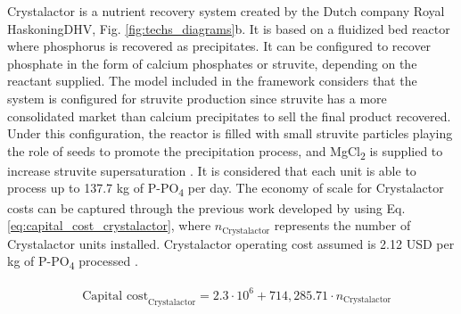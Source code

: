 \documentclass[10pt,a4paper]{article}
\begin{document}
Crystalactor is a nutrient recovery system created by the Dutch company Royal HaskoningDHV, Fig. \ref{fig:techs_diagrams}b. It is based on a fluidized bed reactor where phosphorus is recovered as precipitates. It can be configured to recover phosphate in the form of calcium phosphates or struvite, depending on the reactant supplied. The model included in the framework considers that the system is configured for struvite production since struvite has a more consolidated market than calcium precipitates to sell the final product recovered. Under this configuration, the reactor is filled with small struvite particles playing the role of seeds to promote the precipitation process, and MgCl\textsubscript{2} is supplied to increase struvite supersaturation .
It is considered that each unit is able to process up to 137.7 kg of P-PO\textsubscript{4} per day. The economy of scale for Crystalactor costs can be captured through the previous work developed by  using Eq. \ref{eq:capital_cost_crystalactor}, where $n_{\text{Crystalactor}}$ represents the number of Crystalactor units installed. Crystalactor operating cost assumed is 2.12 USD per kg of P-PO\textsubscript{4} processed .

\begin{align}
& \text{Capital cost}_{\text{Crystalactor}}= 2.3 \cdot 10^{6} + 714,285.71 \cdot n_{\text{Crystalactor}} \label{eq:capital_cost_crystalactor}
\end{align}
\end{document}
